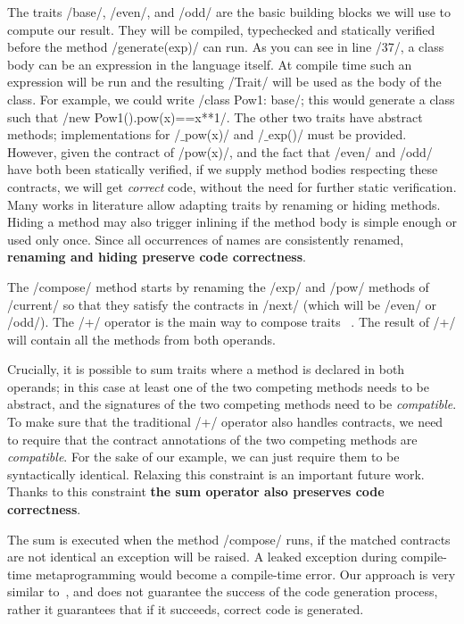 
The traits /base/, /even/, and /odd/ are the basic building blocks we will use to compute our result. They will be compiled, typechecked and statically verified before the method /generate(exp)/ can run.
As you can see in line /37/, a class body can be an expression in the language itself.
At compile time such an expression will be run and the resulting /Trait/ will be used as the body of the class.
For example, we could write /class Pow1: base/; this would generate a class such that /new Pow1().pow(x)==x**1/.
The other two traits have abstract methods; implementations for /$\_$pow(x)/ and /$\_$exp()/ must be provided. However, given the contract of /pow(x)/,
and the fact that /even/ and /odd/ have both been statically verified,
if we supply method bodies respecting these contracts, we will get \emph{correct} code, without the need for further static verification.
Many works in literature allow adapting traits by renaming or hiding methods\cite{servetto2014meta,reppy2007metaprogramming,liquori2008feathertrait}. Hiding a method may also trigger inlining if the method body is simple enough or used only once.
Since all occurrences of names are consistently renamed, \textbf{renaming and hiding preserve code correctness}.

The /compose/ method starts by renaming the /exp/ and /pow/ methods of /current/
so that they satisfy the contracts in /next/ (which will be 
/even/ or /odd/).
The /+/ operator is the main way to compose traits%
~\cite{scharli2003traits,LagorioSZ09}.
The result of /+/ will contain all the methods from both operands. 

Crucially, it is possible to sum traits where a method is declared in both operands; in this case at least one of the two competing methods needs to be abstract, and the signatures of the two competing methods need to be \emph{compatible}.
To make sure that the traditional /+/ operator also handles contracts, we need to require that the contract annotations of the two competing methods  are \emph{compatible}.
For the sake of our example, we can just require them to be syntactically identical. Relaxing this constraint is an important future work.
Thanks to this constraint \textbf{the sum operator also preserves code correctness}. %

The sum is executed when the method /compose/%
runs, if the matched contracts are not identical an exception will be raised. A leaked exception during compile-time metaprogramming would become a compile-time error. 
Our approach is very similar to~\cite{servetto2014meta}, and does not guarantee the success of the code generation process, rather it guarantees that if it succeeds, correct code is generated.

